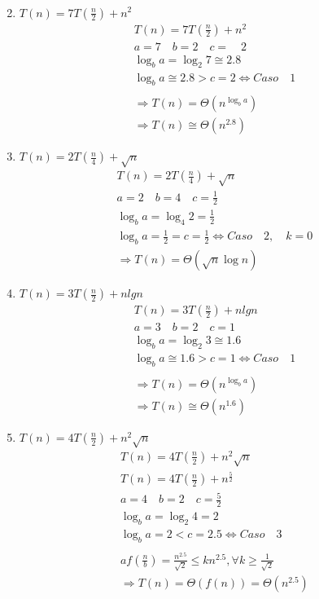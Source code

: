 \documentclass[dcc,uchile,sol]{fcfmcourse}
\begin{document}
\begin{problems}
\begin{enumerate}
\begin{align*}
    \end{align*}
    \item $T(n)=7T(\frac{n}{2})+n^2$
    \begin{align*}
        T(n)=7T(\frac { n }{ 2 } )+n^{ 2 }\\ a=7\quad b=2\quad c=\quad 2\\ \log _{ b }{ a } =\log _{ 2 }{ 7 } \cong 2.8\\ \log _{ b }{ a } \cong 2.8>c=2\Leftrightarrow Caso\quad 1\\ \\ \Rightarrow T(n)=\Theta ({ n }^{ \log _{ b }{ a }  })\\ \Rightarrow T(n)\cong \Theta ({ n }^{ 2.8 })
    \end{align*}
    \item $T(n)=2T(\frac{n}{4})+\sqrt{n}$
    \begin{align*}
        T(n)=2T(\frac { n }{ 4 } )+\sqrt { n } \\ a=2\quad b=4\quad c=\frac { 1 }{ 2 } \\ \log _{ b }{ a } =\log _{ 4 }{ 2 } =\frac { 1 }{ 2 } \\ \log _{ b }{ a } =\frac { 1 }{ 2 } =c=\frac { 1 }{ 2 } \Leftrightarrow Caso\quad 2,\quad k=0\\ \Rightarrow T(n)=\Theta (\sqrt { n } \log { n } )
    \end{align*}
    \item $T(n)=3T(\frac{n}{2})+nlgn$
    \begin{align*}
        T(n)=3T(\frac { n }{ 2 } )+nlgn\\ a=3\quad b=2\quad c=1\\ \log _{ b }{ a } =\log _{ 2 }{ 3 } \cong 1.6\\ \log _{ b }{ a } \cong 1.6>c=1\Leftrightarrow Caso\quad 1\\ \\\Rightarrow T(n)=\Theta ({ n }^{ \log _{ b }{ a }  })\\ \Rightarrow T(n)\cong \Theta ({ n }^{ 1.6 })
    \end{align*}
    \item $T(n)=4T(\frac{n}{2})+n^2\sqrt{n}$
    \begin{align*}
        T(n)=4T(\frac { n }{ 2 } )+n^{ 2 }\sqrt { n } \\ T(n)=4T(\frac { n }{ 2 } )+n^{ \frac { 5 }{ 2 }  }\\ a=4\quad b=2\quad c=\frac { 5 }{ 2 } \\ \log _{ b }{ a } =\log _{ 2 }{ 4 } =2\\ \log _{ b }{ a } =2<c=2.5\Leftrightarrow Caso\quad 3\\ \\ af(\frac { n }{ b } )=\frac { { n }^{ 2.5 } }{ \sqrt { 2 }  } \le kn^{ 2.5 },\forall k\ge \frac { 1 }{ \sqrt { 2 }  } \\ \Rightarrow T(n)=\Theta (f(n))=\Theta (n^{ 2.5 })

\end{align*}
\end{enumerate}
\end{problems}
\end{document}
